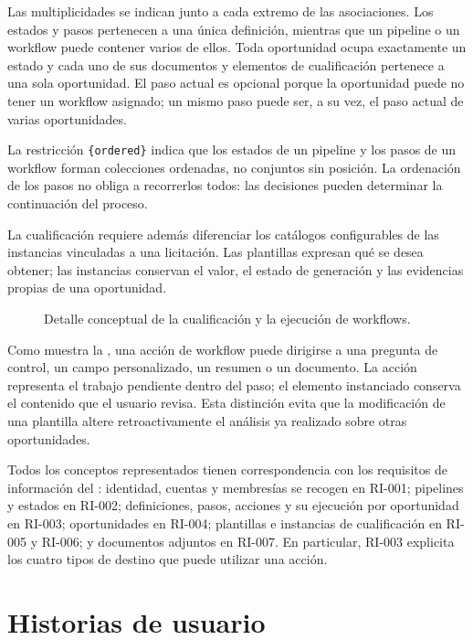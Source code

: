 Las multiplicidades se indican junto a cada extremo de las asociaciones. Los
estados y pasos pertenecen a una única definición, mientras que un pipeline o
un workflow puede contener varios de ellos. Toda oportunidad ocupa exactamente
un estado y cada uno de sus documentos y elementos de cualificación pertenece
a una sola oportunidad. El paso actual es opcional porque la oportunidad puede
no tener un workflow asignado; un mismo paso puede ser, a su vez, el paso actual
de varias oportunidades.

La restricción \texttt{\{ordered\}} indica que los estados de un pipeline y
los pasos de un workflow forman colecciones ordenadas, no conjuntos sin
posición. La ordenación de los pasos no obliga a recorrerlos todos: las
decisiones pueden determinar la continuación del proceso.

La cualificación requiere además diferenciar los catálogos configurables de
las instancias vinculadas a una licitación. Las plantillas expresan qué se desea
obtener; las instancias conservan el valor, el estado de generación y las
evidencias propias de una oportunidad.

\begin{figure}[H]
  \centering
  \resizebox{\textwidth}{!}{
    
  }
  \caption{Detalle conceptual de la cualificación y la ejecución de workflows.}
  \label{fig:qualification-domain-model}
\end{figure}

Como muestra la , una acción de workflow
puede dirigirse a una pregunta de control, un campo personalizado, un resumen
o un documento. La acción representa el trabajo pendiente dentro del paso; el
elemento instanciado conserva el contenido que el usuario revisa. Esta
distinción evita que la modificación de una plantilla altere retroactivamente
el análisis ya realizado sobre otras oportunidades.

Todos los conceptos representados tienen correspondencia con los requisitos de
información del : identidad, cuentas y
membresías se recogen en RI-001; pipelines y estados en RI-002; definiciones,
pasos, acciones y su ejecución por oportunidad en RI-003; oportunidades en
RI-004; plantillas e instancias de cualificación en RI-005 y RI-006; y
documentos adjuntos en RI-007. En particular, RI-003 explicita los cuatro tipos
de destino que puede utilizar una acción.

\section{Historias de usuario}

